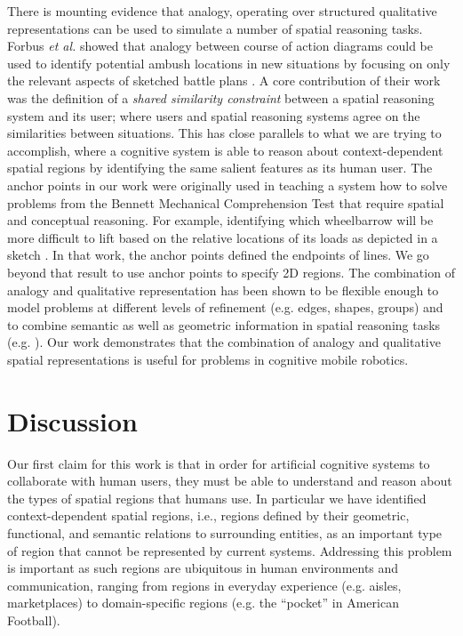 \documentclass[letterpaper]{article}
\begin{document}
There is mounting evidence that analogy, operating over structured qualitative representations can be used to simulate a number of spatial reasoning tasks. Forbus \textit{et al.} showed that analogy between course of action diagrams could be used to identify potential ambush locations in new situations by focusing on only the relevant aspects of sketched battle plans \cite{Forbus/etal2003}. A core contribution of their work was the definition of a \textit{shared similarity constraint} between a spatial reasoning system and its user; where users and spatial reasoning systems agree on the similarities between situations. This has close parallels to what we are trying to accomplish, where a cognitive system is able to reason about context-dependent spatial regions by identifying the same salient features as its human user. The anchor points in our work were originally used in teaching a system how to solve problems from the Bennett Mechanical Comprehension Test that require spatial and conceptual reasoning. For example, identifying which wheelbarrow will be more difficult to lift based on the relative locations of its loads as depicted in a sketch \cite{Klenk/etal2005}. In that work, the anchor points defined the endpoints of lines. We go beyond that result to use anchor points to specify 2D regions.  The combination of analogy and qualitative representation has been shown to be flexible enough to model problems at different levels of refinement (e.g. edges, shapes, groups) \cite{Lovett&Forbus2011} and to combine semantic as well as geometric information in spatial reasoning tasks (e.g. \cite{Lockwood/etal2008}). Our work demonstrates that the combination of analogy and qualitative spatial representations is useful for problems in cognitive mobile robotics. 

\section{Discussion}


Our first claim for this work is that in order for artificial cognitive systems to collaborate with human users, they must be able to understand and reason about the types of spatial regions that humans use. In particular we have identified context-dependent spatial regions, i.e., regions defined by their geometric, functional, and semantic relations to surrounding entities, as an important type of region that cannot be represented by current systems. Addressing this problem is important as such regions are ubiquitous in human environments and communication, ranging from regions in everyday experience (e.g. aisles, marketplaces) to domain-specific regions (e.g. the ``pocket'' in American Football). 
\end{document}
